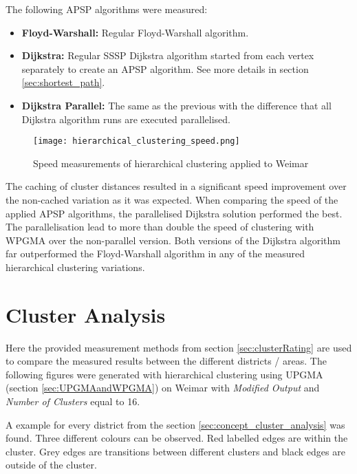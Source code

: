 The following \acrshort{APSP} algorithms were measured:

\begin{itemize}
    \item \textbf{Floyd-Warshall:} Regular Floyd-Warshall algorithm.
    \item \textbf{Dijkstra:} Regular \acrshort{SSSP} Dijkstra algorithm started from each vertex separately to create an \acrshort{APSP} algorithm. See more details in section \ref{sec:shortest_path}.
    \item \textbf{Dijkstra Parallel:} The same as the previous with the difference that all Dijkstra algorithm runs are executed parallelised.
\end{itemize}

\begin{figure}[!ht]
    \centering
    \begin{mdframed}[style=mdthight]
        \texttt{[image: hierarchical\_clustering\_speed.png]}
    \end{mdframed}
    \caption{Speed measurements of hierarchical clustering applied to Weimar \label{fig:hierarchical_clustering_speed}}
\end{figure}

The caching of cluster distances resulted in a significant speed improvement over the non-cached variation as it was expected. When comparing the speed of the applied \acrshort{APSP} algorithms, the parallelised Dijkstra solution performed the best. The parallelisation lead to more than double the speed of clustering with WPGMA over the non-parallel version. Both versions of the Dijkstra algorithm far outperformed the Floyd-Warshall algorithm in any of the measured hierarchical clustering variations.

\pagebreak
\section{Cluster Analysis}
\label{sec:measurements-cluster-analysis}
Here the provided measurement methods from section \ref{sec:clusterRating} are used to compare the measured results between the different districts / areas. The following figures were generated with hierarchical clustering using UPGMA (section \ref{sec:UPGMAandWPGMA}) on Weimar with \textit{Modified Output} and \textit{Number of Clusters} equal to 16.

A example for every district from the section \ref{sec:concept_cluster_analysis} was found. Three different colours can be observed. Red labelled edges are within the cluster. Grey edges are transitions between different clusters and black edges are outside of the cluster.


